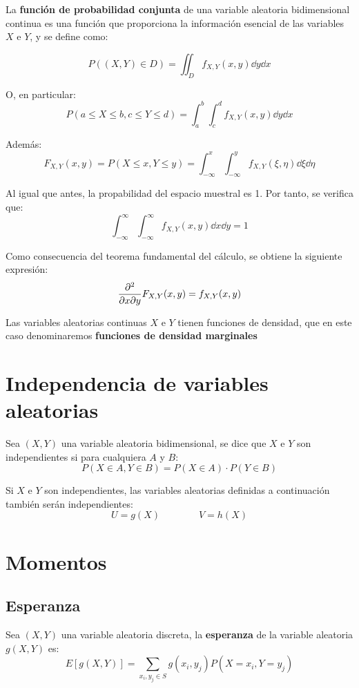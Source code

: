 \documentclass[a4paper]{book}
\begin{document}
La \textbf{función de probabilidad conjunta} de una variable aleatoria bidimensional continua es una función que proporciona la información esencial de las variables $X$ e $Y$, y se define como:

\[ P\left( \left( X,Y \right) \in D\right) = \iint_{D}f_{X,Y}(x,y)\dd{y} \dd{x}\]

O, en particular:
\[P\left( a\leq X \leq b, c\leq Y \leq d\right) = \int_{a}^{b}\int_{c}^{d} f_{X,Y}(x,y)\dd{y} \dd{x}\]

Además:
\[\boxed{F_{X,Y}(x,y) = P \left( X\leq x, Y\leq y\right)} = \int_{-\infty}^{x}\int_{-\infty}^{y} f_{X,Y}(\xi , \eta ) \dd{\xi} \dd{\eta}\]

Al igual que antes, la propabilidad del espacio muestral es 1. Por tanto, se verifica que:
\[\int_{-\infty}^{\infty}\int_{-\infty}^{\infty} f_{X,Y}(x,y) \dd{x} \dd{y} = 1\]

Como consecuencia del teorema fundamental del cálculo, se obtiene la siguiente expresión:
\[\pdv[2]{}{x}{y} F_{X,Y}(x,y) = f_{X,Y}(x,y)\]

Las variables aleatorias continuas $X$ e $Y$ tienen funciones de densidad, que en este caso denominaremos \textbf{funciones de densidad marginales}

\section{Independencia de variables aleatorias}
Sea $\left( X,Y\right)$ una variable aleatoria bidimensional, se dice que $X$ e $Y$ son independientes si para cualquiera $A$ y $B$:
\[P\left( X\in A, Y\in B\right) = P\left(X\in A\right)\cdot P\left(Y\in B\right)\]

Si $X$ e $Y$ son independientes, las variables aleatorias definidas a continuación también serán independientes:
\[U=g(X) \qquad \qquad V=h(X)\]

\section{Momentos}

\subsection{Esperanza}

Sea $\left(X,Y\right)$ una variable aleatoria discreta, la \textbf{esperanza} de la variable aleatoria $g\left(X,Y\right)$ es:
\[E\left[g\left(X,Y\right)\right] = \sum_{x_i,y_j\in S}g\left(x_i,y_j\right)P\left(X=x_i, Y=y_j\right)\]
\end{document}
